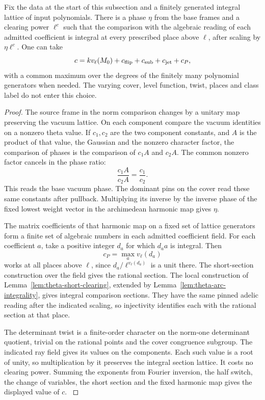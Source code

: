 \begin{proposition}
\label{prop:theta-uniform-cover-clearing}
Fix the data at the start of this subsection and a finitely generated
integral lattice of input polynomials. There is a phase \(\eta\) from the
base frames and a clearing power \(\ell^c\) such that the comparison
with the algebraic reading of each admitted coefficient is integral
at every prescribed place above \(\ell\), after scaling by
\(\eta\ell^c\). One can take
\[
    c=k v_\ell(M_0)+c_{\rm flip}+c_{\rm sub}+c_{\rm jet}+c_P,
\]
with a common maximum over the degrees of the finitely many
polynomial generators when needed. The varying cover, level function,
twist, places and class label do not enter this choice.
\end{proposition}

\begin{proof}
The source frame in the norm comparison changes by a unitary map
preserving the vacuum lattice. On each component compare the
vacuum identities on a nonzero theta value. If \(c_1,c_2\)
are the two component constants, and \(A\) is the product of
that value, the Gaussian and the nonzero character factor, the
comparison of phases is the comparison of \(c_1 A\) and \(c_2 A\).
The common nonzero factor cancels in the phase ratio:
\[
 \frac{c_1 A}{c_2 A}=\frac{c_1}{c_2}.
\]
This reads the base vacuum phase. The dominant pins
on the cover read these same constants after pullback. Multiplying
its inverse by the inverse phase of the fixed lowest weight vector
in the archimedean harmonic map gives \(\eta\).

The matrix coefficients of that harmonic map on a fixed set of
lattice generators form a finite set of algebraic numbers in each
admitted coefficient field. For each coefficient \(a\), take a
positive integer \(d_a\) for which \(d_a a\) is integral. Then
\[
 c_P=\max_a v_\ell(d_a)
\]
works at all places above \(\ell\),
since \(d_a/\ell^{v_\ell(d_a)}\) is a unit there. The short-section
construction over the field gives the rational section. The local
construction of Lemma~\ref{lem:theta-short-clearing}, extended
by Lemma~\ref{lem:theta-arc-integrality}, gives integral comparison
sections. They have the same pinned adelic reading after the indicated
scaling, so injectivity identifies each with the rational section
at that place.

The determinant twist is a finite-order character on the
norm-one determinant quotient, trivial on the rational points
and the cover congruence subgroup. The indicated ray field gives
its values on the components. Each such value is a root of unity,
so multiplication by it preserves the integral section lattice.
It costs no clearing power. Summing the exponents from Fourier
inversion, the half switch, the change of variables, the short
section and the fixed harmonic map gives the displayed value of
\(c\). \label{cor:theta-cover-integrality-3}
\end{proof}

